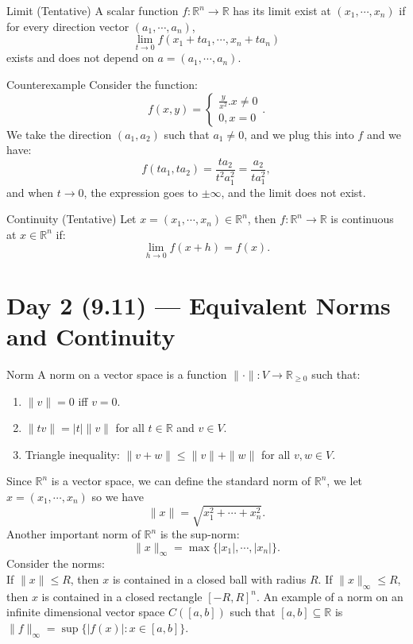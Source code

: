 \documentclass[11pt]{article}
\newenvironment{definition}[1]{\begin{defbox}{#1}{}}{\end{defbox}}
\newenvironment{example}[1]{\begin{exbox}{#1}{}}{\end{exbox}}
\theoremstyle{quiet}
\theoremstyle{quietremark}
\begin{document}
\begin{definition}{Limit (Tentative)}
A scalar function $f:\mathbb{R}^n\to\mathbb{R}$ has its limit exist at $(x_1,\cdots,x_n)$ if for every direction vector $(a_1,\cdots,a_n)$, 
\[
\lim_{t\to 0}f(x_1+ta_1,\cdots,x_n+ta_n)
\]
exists and does not depend on $a=(a_1,\cdots,a_n).$
\end{definition}

\begin{example}{Counterexample}
Consider the function: 
\[
f(x,y)=\begin{cases}\displaystyle\frac{y}{x^2}. x\ne 0\\0,x=0\end{cases}.
\]
We take the direction $(a_1,a_2)$ such that $a_1\ne 0$, and we plug this into $f$ and we have:
\[
f(ta_1,ta_2)=\frac{ta_2}{t^2a_1^2}=\frac{a_2}{ta_1^2}, 
\]
and when $t\to 0$, the expression goes to $\pm \infty$, and the limit does not exist. 
\end{example}

\begin{definition}{Continuity (Tentative)}
Let $x=(x_1,\cdots,x_n)\in\mathbb{R}^n$, then $f:\mathbb{R}^n\to\mathbb{R}$ is continuous at $x\in\mathbb{R}^n$ if:
\[
\lim_{h\to 0}f(x+h)=f(x).
\]
\end{definition}

\newpage

\section{Day 2 (9.11) --- Equivalent Norms and Continuity}

\begin{definition}{Norm}
A norm on a vector space is a function $\|\cdot\|:V\to \mathbb{R}_{\ge 0}$ such that:
\begin{enumerate}
\item $\|v\|=0$ iff $v=0$.
\item $\|tv\|=|t|\|v\|$ for all $t\in\mathbb{R}$ and $v\in V$.
\item Triangle inequality: $\|v+w\|\le\|v\|+\|w\|$ for all $v,w\in V$.
\end{enumerate}
\end{definition}

Since $\mathbb{R}^n$ is a vector space, we can define the standard norm of $\mathbb{R}^n$, we let $x=(x_1,\cdots,x_n)$ so we have 
\[
\|x\|=\sqrt{x_1^2+\cdots+x_n^2}.
\]
Another important norm of $\mathbb{R}^n$ is the sup-norm:
\[
\|x\|_\infty=\max\{|x_1|,\cdots,|x_n|\}.
\]
Consider the norms:\\
If $\|x\|\le R$, then $x$ is contained in a closed ball with radius $R$. If $\|x\|_\infty\le R$, then $x$ is contained in a closed rectangle $[-R,R]^n$. An example of a norm on an infinite dimensional vector space $C({[a,b]})$ such that $[a,b]\subseteq\mathbb{R}$ is $\|f\|_\infty=\sup\{|f(x)|:x\in[a,b]\}$.
\end{document}
